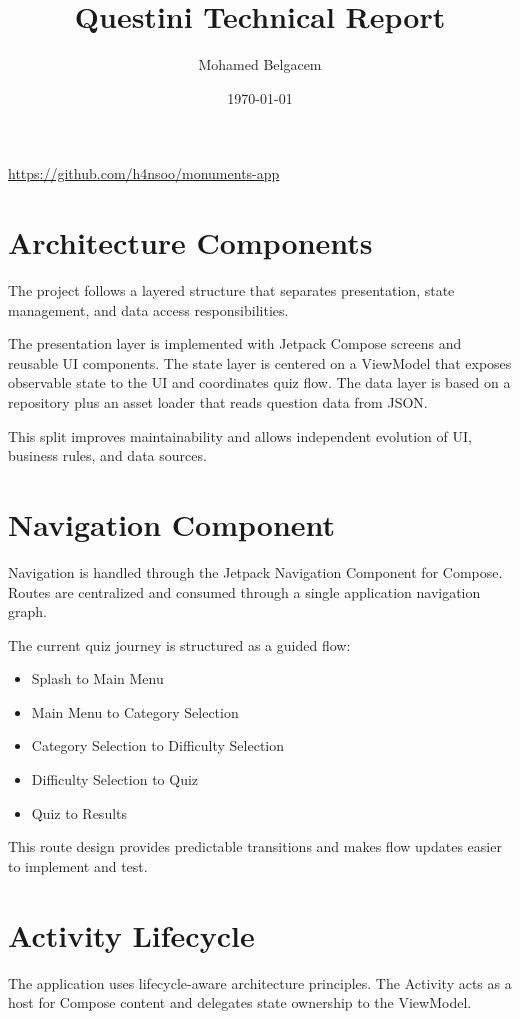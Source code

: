 \documentclass[12pt,a4paper]{article}
\title{Questini Technical Report}
\author{Mohamed Belgacem}
\date{\today}
\begin{document}
\maketitle
\onehalfspacing

\begin{center}
\href{https://github.com/h4nsoo/monuments-app}{https://github.com/h4nsoo/monuments-app}
\end{center}

\tableofcontents
\newpage

\section{Architecture Components}
The project follows a layered structure that separates presentation, state management, and data access responsibilities.

The presentation layer is implemented with Jetpack Compose screens and reusable UI components. The state layer is centered on a ViewModel that exposes observable state to the UI and coordinates quiz flow. The data layer is based on a repository plus an asset loader that reads question data from JSON.

This split improves maintainability and allows independent evolution of UI, business rules, and data sources.

\section{Navigation Component}
Navigation is handled through the Jetpack Navigation Component for Compose. Routes are centralized and consumed through a single application navigation graph.

The current quiz journey is structured as a guided flow:
\begin{itemize}
    \item Splash to Main Menu
    \item Main Menu to Category Selection
    \item Category Selection to Difficulty Selection
    \item Difficulty Selection to Quiz
    \item Quiz to Results
\end{itemize}

This route design provides predictable transitions and makes flow updates easier to implement and test.

\section{Activity Lifecycle}
The application uses lifecycle-aware architecture principles. The Activity acts as a host for Compose content and delegates state ownership to the ViewModel.
\end{document}
